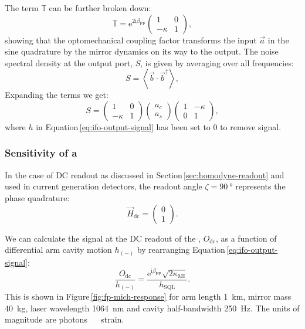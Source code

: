 The term $\mathbb{T}$ can be further broken down:
\begin{equation}
  \mathbb{T} = \text{e}^{2 \text{i} \beta_{\text{FP}}}
  \begin{pmatrix}
    1 & 0 \\
    -\kappa & 1
  \end{pmatrix},
\end{equation}
showing that the optomechanical coupling factor transforms the input $\vec{a}$ in the sine quadrature by the mirror dynamics on its way to the output. The noise spectral density at the output port, $S$, is given by averaging over all frequencies:
\begin{equation}
  S = \left< \vec{b} \cdot \vec{b}^{\dag} \right>,
\end{equation}
Expanding the terms we get:
\begin{equation}
  S =
  \begin{pmatrix}
    1 & 0 \\
    -\kappa & 1
  \end{pmatrix}
  \begin{pmatrix}
    a_c \\
    a_s
  \end{pmatrix}
  \begin{pmatrix}
    1 & -\kappa \\
    0 & 1
  \end{pmatrix},
\end{equation}
where $h$ in Equation\,\ref{eq:ifo-output-signal} has been set to \num{0} to remove signal.

\subsubsection{Sensitivity of a \FPMI{}}
In the case of \gls{DC} readout as discussed in Section\,\ref{sec:homodyne-readout} and used in current generation detectors, the readout angle $\zeta = \SI{90}{\degree}$ represents the phase quadrature:
\begin{equation}
  \vec{H}_{\text{dc}} =
  \begin{pmatrix}
    0 \\
    1
  \end{pmatrix}.
\end{equation}

We can calculate the signal at the \gls{DC} readout of the \FPMI{}, $O_{\text{dc}}$, as a function of differential arm cavity motion $h_{\left( - \right)}$ by rearranging Equation\,\ref{eq:ifo-output-signal}:
\begin{equation}
  \frac{O_{\text{dc}}}{h_{\left( - \right)}} = \frac{\text{e}^{\text{i} \beta_{\text{FP}}} \sqrt{2 \kappa_{\text{MI}}}}{h_{\text{SQL}}}.
\end{equation}
This is shown in Figure\,\ref{fig:fp-mich-response} for arm length \SI{1}{\kilo\meter}, mirror mass \SI{40}{\kilo\gram}, laser wavelength \SI{1064}{\nano\meter} and cavity half-bandwidth \SI{250}{\hertz}. The units of magnitude are photons \SI{}{\per\sqrthz} strain.

